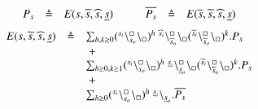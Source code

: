 \[
\begin{array}{lcl@{\hskip 1cm}lcl}
 P_s &\defeq & E(s,\widetilde{s},\widehat{s},\underline{s}) 
 &
 \overline{P_s}& \defeq & E(\overline{s},\widetilde{s},\widehat{s},\underline{s})
\end{array}
\]
%
\[
\begin{array}{rcl}
 E(s,\widetilde{s},\widehat{s},\underline{s}) & \defeq &\sum_{h,k\geq 0}  
  (\startchain{s_i}\chainedlink{s_o}{\noact}\chainend{\noact})^h \ \startchain{\widehat{s}_i}\chainedlink{\widehat{s}_o}{\noact}\chainend{\noact} (\startchain{\widetilde{s}_i}\chainedlink{\widetilde{s}_o}{\noact}\chainend{\noact})^k.P_s\\
&&\ + \\
&&
\sum_{h\geq 0,k\geq 1}
 (\startchain{s_i}\chainedlink{s_o}{\noact}\chainend{\noact})^h \ \startchain{\underline{s}_i}\chainedlink{\underline{s}_o}{\noact}\chainend{\noact}(\startchain{\widetilde{s}_i}\chainedlink{\widetilde{s}_o}{\noact}\chainend{\noact})^k.P_s\\
&&\ +\\
&&\sum_{h\geq 0}(\startchain{s_i}\chainedlink{s_o}{\noact}\chainend{\noact})^h \ \link{\underline{s}_i}{\underline{s}_o}.\overline{P_s}
\end{array}
\]

